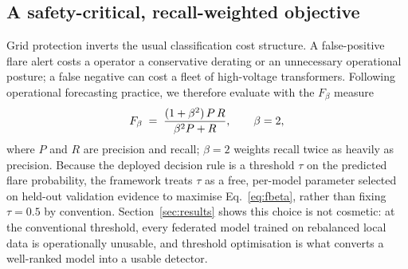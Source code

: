 \subsection{A safety-critical, recall-weighted objective}

Grid protection inverts the usual classification cost structure. A
false-positive flare alert costs a operator a conservative derating or
an unnecessary operational posture; a false negative can cost a fleet
of high-voltage transformers. Following operational forecasting
practice, we therefore evaluate with the $F_\beta$ measure
\begin{equation}\label{eq:fbeta}
    F_{\beta} \;=\;
    \frac{(1+\beta^{2})\, P\, R}{\beta^{2} P + R},
    \qquad \beta = 2,
\end{equation}
where $P$ and $R$ are precision and recall; $\beta = 2$ weights recall
twice as heavily as precision. Because the deployed decision rule is a
threshold $\tau$ on the predicted flare probability, the framework
treats $\tau$ as a free, per-model parameter selected on held-out
validation evidence to maximise Eq.~\eqref{eq:fbeta}, rather than
fixing $\tau = 0.5$ by convention. Section~\ref{sec:results} shows this
choice is not cosmetic: at the conventional threshold, every federated
model trained on rebalanced local data is operationally unusable, and
threshold optimisation is what converts a well-ranked model into a
usable detector.
